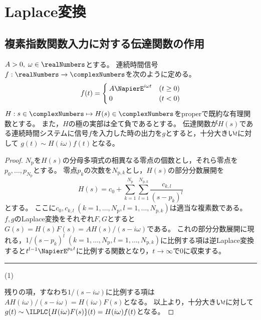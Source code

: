 \part{Laplace変換}
    \chapter{複素指数関数入力に対する伝達関数の作用}
        \begin{shadebox}
            $A>0,\;\omega \in \realNumbers$とする。
            連続時間信号$f: \realNumbers \to \complexNumbers$を次のように定める。
            \[
                f(t) =
                \begin{cases}
                    A\NapierE^{i\omega t} & (t\geq 0) \\
                    0 & (t<0)
                \end{cases}
            \]
            $H: s\in\complexNumbers \mapsto H(s) \in \complexNumbers$をproperで既約な有理関数とする。
            また，$H$の極の実部は全て負であるとする。
            伝達関数が$H(s)$である連続時間システムに信号$f$を入力した時の出力を$g$とすると，十分大きい$t$に対して
            $g(t) \sim H(i\omega)f(t)$となる。
        \end{shadebox}
        \begin{proof}
            \quad\par
            $N_\text{p}$を$H(s)$の分母多項式の相異なる零点の個数とし，それら零点を$p_0,\dots,p_{N_\text{p}}$とする。
            零点$p_k$の次数を$N_{\text{p},k}$とし，$H(s)$の部分分数展開を
            \[ H(s) = c_0 + \sum_{k=1}^{N_\mathrm{p}} \sum_{l=1}^{N_{\mathrm{p},k}} \frac{c_{k,l}}{(s-p_k)^l} \]
            とする。
            ここに$c_0,c_{k,l}\;(k=1,\dots,N_\mathrm{p},l=1,\dots,N_{\mathrm{p},k})$は適当な複素数である。
            $f,g$のLaplace変換をそれぞれ$F,G$とすると$G(s) = H(s)F(s) = A H(s)/(s-i\omega)$である。
            これの部分分数展開に現れる，$1/(s-p_k)^l\;(k=1,\dots,N_\mathrm{p},l=1,\dots,N_{\mathrm{p},k})$に比例する項は逆Laplace変換すると$t^{l-1}\NapierE^{p_k t}$に比例する関数となり，$t\to\infty$で0に収束する。\hfill \rule{10cm}{0.4pt}(1)
            \par
            残りの項，すなわち$1/(s-i\omega)$に比例する項は$AH(i\omega)/(s-i\omega) = H(i\omega)F(s)$となる。
            以上より，十分大きい$t$に対して$g(t) \sim \ILPLC{H(i\omega)F(s)}(t) = H(i\omega)f(t)$となる。
        \end{proof}
